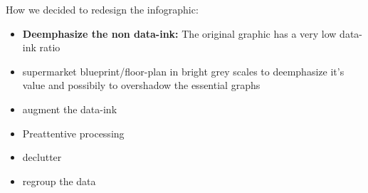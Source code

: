 How we decided to redesign the infographic:

\begin{itemize}
	\item \textbf{Deemphasize the non data-ink:} The original graphic has a very low data-ink ratio
    \item supermarket blueprint/floor-plan in bright grey scales to deemphasize
		it's value and possibily to overshadow the essential graphs
	\item augment the data-ink
    \item Preattentive processing
	\item declutter
	\item regroup the data
\end{itemize}